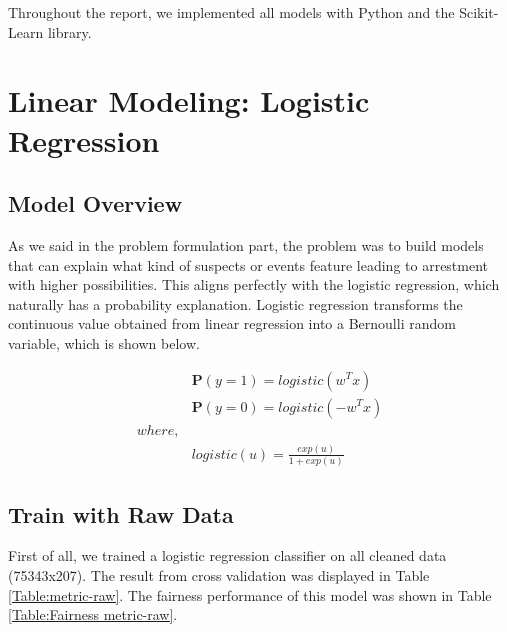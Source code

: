 Throughout the report, we implemented all models with Python and the Scikit-Learn \cite{scikit-learn}  library. \label{sec:problem}


\section{Linear Modeling: Logistic Regression} \label{sec:linear}
\subsection{Model Overview}
As we said in the problem formulation part, the problem was to build models that can explain what kind of suspects or events feature leading to arrestment with higher possibilities. This aligns perfectly with the logistic regression, which naturally has a probability explanation. Logistic regression transforms the continuous value obtained from linear regression into a Bernoulli random variable, which is shown below.

 \vspace{-15pt}
\begin{align*}
    &\mathbf{P}(y=1) = logistic(w^{T}x)\\
    &\mathbf{P}(y=0) = logistic(-w^{T}x)\\
    where,\\
    &logistic(u) = \frac{exp(u)}{1+exp(u)}
\end{align*}

\subsection{Train with Raw Data}
First of all, we trained a logistic regression classifier on all cleaned data (75343x207). The result from cross validation was displayed in Table \ref{Table:metric-raw}. The fairness performance of this model was shown in Table \ref{Table:Fairness metric-raw}.


